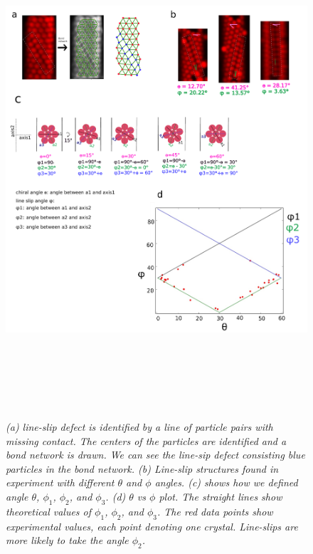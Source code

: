 \documentclass[12pt]{article}
\begin{document}
\begin{figure}[!ht]
	\setcounter{topnumber}{1}
	\setcounter{bottomnumber}{1}
	\setcounter{totalnumber}{1}
	\renewcommand{\topfraction}{0.95}
	\renewcommand{\bottomfraction}{0.95}
	\renewcommand{\textfraction}{0.15}
	\renewcommand{\floatpagefraction}{0.9}
    \centering
    \includegraphics[width = 17cm, height = 18.4cm]{fig2}
    \caption{\textit{(a) line-slip defect is identified by a line of particle pairs with missing contact. The centers of the particles are identified and a bond network is drawn. We can see the line-sip defect consisting blue particles in the bond network. (b) Line-slip structures found in experiment with different $\theta$ and $\phi$ angles. (c) shows how we defined angle $\theta$, $\phi_1$, $\phi_2$, and $\phi_3$. (d) $\theta$ vs $\phi$ plot. The straight lines show theoretical values of $\phi_1$, $\phi_2$, and $\phi_3$. The red data points show experimental values, each point denoting one crystal. Line-slips are more likely to take the angle $\phi_2$.} }
    \label{fig2:line-slips}
\end{figure}
\end{document}
